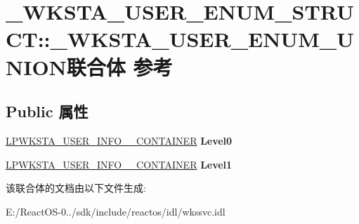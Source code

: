 \hypertarget{union___w_k_s_t_a___u_s_e_r___e_n_u_m___s_t_r_u_c_t_1_1___w_k_s_t_a___u_s_e_r___e_n_u_m___u_n_i_o_n}{}\section{\+\_\+\+W\+K\+S\+T\+A\+\_\+\+U\+S\+E\+R\+\_\+\+E\+N\+U\+M\+\_\+\+S\+T\+R\+U\+CT\+:\+:\+\_\+\+W\+K\+S\+T\+A\+\_\+\+U\+S\+E\+R\+\_\+\+E\+N\+U\+M\+\_\+\+U\+N\+I\+O\+N联合体 参考}
\label{union___w_k_s_t_a___u_s_e_r___e_n_u_m___s_t_r_u_c_t_1_1___w_k_s_t_a___u_s_e_r___e_n_u_m___u_n_i_o_n}
\subsection*{Public 属性}
\begin{DoxyCompactItemize}
\item 
\mbox{\label{union___w_k_s_t_a___u_s_e_r___e_n_u_m___s_t_r_u_c_t_1_1___w_k_s_t_a___u_s_e_r___e_n_u_m___u_n_i_o_n_a40ed51c20616b8f04563ae7bc23503ae}} 
\hyperlink{struct___w_k_s_t_a___u_s_e_r___i_n_f_o__0___c_o_n_t_a_i_n_e_r}{L\+P\+W\+K\+S\+T\+A\+\_\+\+U\+S\+E\+R\+\_\+\+I\+N\+F\+O\+\_\+\_\+\+C\+O\+N\+T\+A\+I\+N\+ER} {\bfseries Level0}
\item 
\mbox{\label{union___w_k_s_t_a___u_s_e_r___e_n_u_m___s_t_r_u_c_t_1_1___w_k_s_t_a___u_s_e_r___e_n_u_m___u_n_i_o_n_a80e6e99bc2330acbd3f15588e64d06f9}} 
\hyperlink{struct___w_k_s_t_a___u_s_e_r___i_n_f_o__1___c_o_n_t_a_i_n_e_r}{L\+P\+W\+K\+S\+T\+A\+\_\+\+U\+S\+E\+R\+\_\+\+I\+N\+F\+O\+\_\+\_\+\+C\+O\+N\+T\+A\+I\+N\+ER} {\bfseries Level1}
\end{DoxyCompactItemize}


该联合体的文档由以下文件生成\+:\begin{DoxyCompactItemize}
\item 
E\+:/\+React\+O\+S-\/0../sdk/include/reactos/idl/wkssvc.\+idl\end{DoxyCompactItemize}

